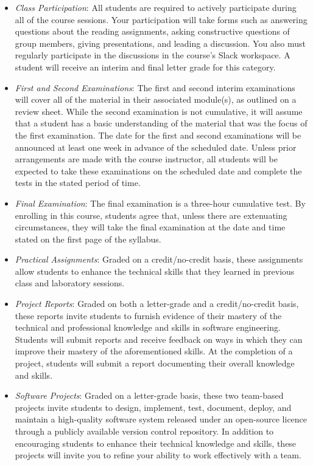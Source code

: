 \documentclass[11pt]{article}
\begin{document}
\begin{itemize}

  \item {\em Class Participation\/}: All students are required to actively
    participate during all of the course sessions. Your participation will take
    forms such as answering questions about the reading assignments, asking
    constructive questions of group members, giving presentations, and leading a
    discussion. You also must regularly participate in the discussions in the
    course's Slack workspace. A student will receive an interim and final letter
    grade for this category.

  \item {\em First and Second Examinations\/}: The first and second interim
    examinations will cover all of the material in their associated module(s),
    as outlined on a review sheet. While the second examination is not
    cumulative, it will assume that a student has a basic understanding of the
    material that was the focus of the first examination. The date for the first
    and second examinations will be announced at least one week in advance of
    the scheduled date. Unless prior arrangements are made with the course
    instructor, all students will be expected to take these examinations on the
    scheduled date and complete the tests in the stated period of time.

  \item {\em Final Examination\/}: The final examination is a three-hour
    cumulative test. By enrolling in this course, students agree that, unless
    there are extenuating circumstances, they will take the final examination at
    the date and time stated on the first page of the syllabus.

  \item {\em Practical Assignments\/}: Graded on a credit/no-credit basis, these
    assignments allow students to enhance the technical skills that they learned
    in previous class and laboratory sessions.

  \item {\em Project Reports\/}: Graded on both a letter-grade and a
    credit/no-credit basis, these reports invite students to furnish evidence of
    their mastery of the technical and professional knowledge and skills in
    software engineering. Students will submit reports and receive feedback on
    ways in which they can improve their mastery of the aforementioned skills.
    At the completion of a project, students will submit a report documenting
    their overall knowledge and skills.

  \item {\em Software Projects\/}: Graded on a letter-grade basis, these two
    team-based projects invite students to design, implement, test, document,
    deploy, and maintain a high-quality software system released under an
    open-source licence through a publicly available version control repository.
    In addition to encouraging students to enhance their technical knowledge and
    skills, these projects will invite you to refine your ability to work
    effectively with a team.

\end{itemize}
\end{document}
